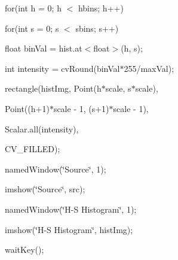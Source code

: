 {\ttfamily }

{\ttfamily for(int h = 0; h $<$ hbins; h++)}

{\ttfamily }

{\ttfamily }

{\ttfamily for(int s = 0; s $<$ sbins; s++)}

{\ttfamily }

{\ttfamily }

{\ttfamily float bin\+Val = hist.\+at$<$float$>$(h, s);}

{\ttfamily }

{\ttfamily }

{\ttfamily int intensity = cv\+Round(bin\+Val$\ast$255/max\+Val);}

{\ttfamily }

{\ttfamily }

{\ttfamily rectangle(hist\+Img, Point(h$\ast$scale, s$\ast$scale),}

{\ttfamily }

{\ttfamily }

{\ttfamily Point((h+1)$\ast$scale -\/ 1, (s+1)$\ast$scale -\/ 1),}

{\ttfamily }

{\ttfamily }

{\ttfamily Scalar.\+all(intensity),}

{\ttfamily }

{\ttfamily }

{\ttfamily C\+V\+\_\+\+F\+I\+L\+L\+ED);}

{\ttfamily }

{\ttfamily }

{\ttfamily named\+Window(\char`\"{}\+Source\char`\"{}, 1);}

{\ttfamily }

{\ttfamily }

{\ttfamily imshow(\char`\"{}\+Source\char`\"{}, src);}

{\ttfamily }

{\ttfamily }

{\ttfamily named\+Window(\char`\"{}\+H-\/\+S Histogram\char`\"{}, 1);}

{\ttfamily }

{\ttfamily }

{\ttfamily imshow(\char`\"{}\+H-\/\+S Histogram\char`\"{}, hist\+Img);}

{\ttfamily }

{\ttfamily }

{\ttfamily wait\+Key();}

{\ttfamily }

